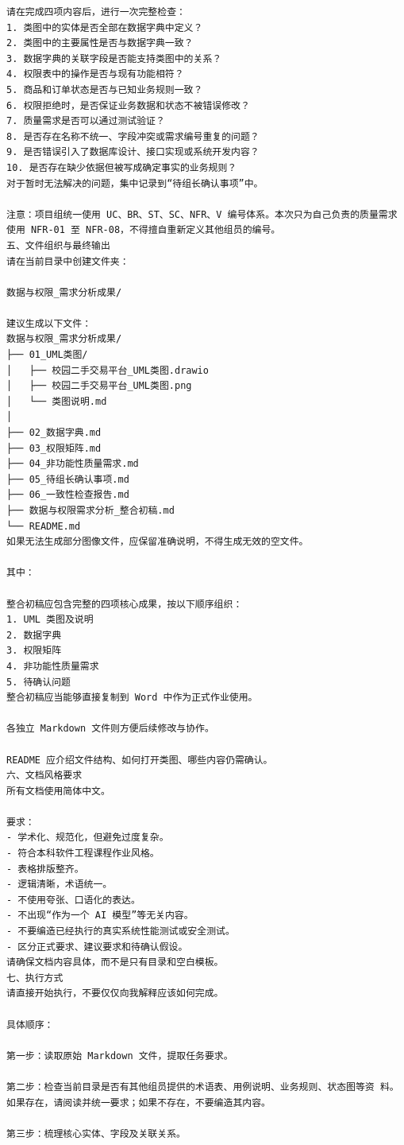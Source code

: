 \documentclass[heading=true,UTF8,a4paper,zihao=-4]{ctexart}
\begin{document}
\begin{QABox}
\begin{lstlisting}
请在完成四项内容后，进行一次完整检查：
1. 类图中的实体是否全部在数据字典中定义？
2. 类图中的主要属性是否与数据字典一致？
3. 数据字典的关联字段是否能支持类图中的关系？
4. 权限表中的操作是否与现有功能相符？
5. 商品和订单状态是否与已知业务规则一致？
6. 权限拒绝时，是否保证业务数据和状态不被错误修改？
7. 质量需求是否可以通过测试验证？
8. 是否存在名称不统一、字段冲突或需求编号重复的问题？
9. 是否错误引入了数据库设计、接口实现或系统开发内容？
10. 是否存在缺少依据但被写成确定事实的业务规则？
对于暂时无法解决的问题，集中记录到“待组长确认事项”中。

注意：项目组统一使用 UC、BR、ST、SC、NFR、V 编号体系。本次只为自己负责的质量需求使用 NFR-01 至 NFR-08，不得擅自重新定义其他组员的编号。
五、文件组织与最终输出
请在当前目录中创建文件夹：

数据与权限_需求分析成果/

建议生成以下文件：
数据与权限_需求分析成果/
├── 01_UML类图/
│   ├── 校园二手交易平台_UML类图.drawio
│   ├── 校园二手交易平台_UML类图.png
│   └── 类图说明.md
│
├── 02_数据字典.md
├── 03_权限矩阵.md
├── 04_非功能性质量需求.md
├── 05_待组长确认事项.md
├── 06_一致性检查报告.md
├── 数据与权限需求分析_整合初稿.md
└── README.md
如果无法生成部分图像文件，应保留准确说明，不得生成无效的空文件。

其中：

整合初稿应包含完整的四项核心成果，按以下顺序组织：
1. UML 类图及说明
2. 数据字典
3. 权限矩阵
4. 非功能性质量需求
5. 待确认问题
整合初稿应当能够直接复制到 Word 中作为正式作业使用。

各独立 Markdown 文件则方便后续修改与协作。

README 应介绍文件结构、如何打开类图、哪些内容仍需确认。
六、文档风格要求
所有文档使用简体中文。

要求：
- 学术化、规范化，但避免过度复杂。
- 符合本科软件工程课程作业风格。
- 表格排版整齐。
- 逻辑清晰，术语统一。
- 不使用夸张、口语化的表达。
- 不出现“作为一个 AI 模型”等无关内容。
- 不要编造已经执行的真实系统性能测试或安全测试。
- 区分正式要求、建议要求和待确认假设。
请确保文档内容具体，而不是只有目录和空白模板。
七、执行方式
请直接开始执行，不要仅仅向我解释应该如何完成。

具体顺序：

第一步：读取原始 Markdown 文件，提取任务要求。

第二步：检查当前目录是否有其他组员提供的术语表、用例说明、业务规则、状态图等资 料。如果存在，请阅读并统一要求；如果不存在，不要编造其内容。

第三步：梳理核心实体、字段及关联关系。


\end{lstlisting}
\end{QABox}
\end{document}
